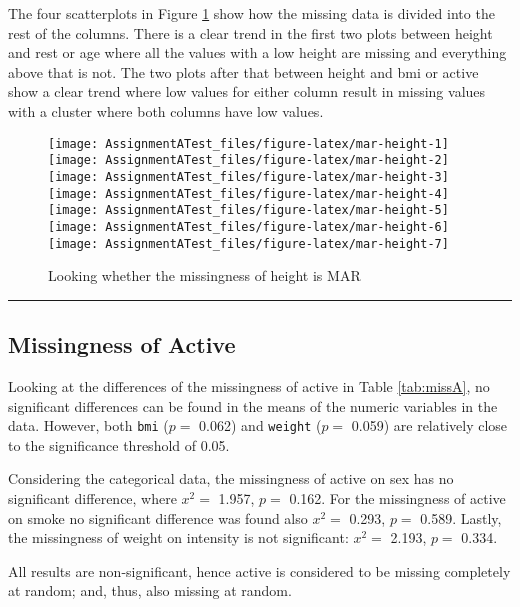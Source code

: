\documentclass[
]{article}
\begin{document}
The four scatterplots in Figure \ref{fig:mar-height} show how the missing data is divided into the rest of the columns. There is a clear trend in the first two plots between height and rest or age where all the values with a low height are missing and everything above that is not. The two plots after that between height and bmi or active show a clear trend where low values for either column result in missing values with a cluster where both columns have low values.

\begin{figure}
\texttt{[image: AssignmentATest\_files/figure-latex/mar-height-1]} \texttt{[image: AssignmentATest\_files/figure-latex/mar-height-2]} \texttt{[image: AssignmentATest\_files/figure-latex/mar-height-3]} \texttt{[image: AssignmentATest\_files/figure-latex/mar-height-4]} \texttt{[image: AssignmentATest\_files/figure-latex/mar-height-5]} \texttt{[image: AssignmentATest\_files/figure-latex/mar-height-6]} \texttt{[image: AssignmentATest\_files/figure-latex/mar-height-7]} \caption{Looking whether the missingness of height is MAR}\label{fig:mar-height}
\end{figure}

\begin{center}\rule{0.5\linewidth}{0.5pt}\end{center}

\hypertarget{missingness-of-active}{%
\subsection{Missingness of Active}\label{missingness-of-active}}

Looking at the differences of the missingness of active in Table \ref{tab:missA}, no significant differences can be found in the means of the numeric variables in the data. However, both \texttt{bmi} (\(p =\) 0.062) and \texttt{weight} (\(p =\) 0.059) are relatively close to the significance threshold of 0.05.

Considering the categorical data, the missingness of active on sex has no significant difference, where \(x^2 =\) 1.957, \(p =\) 0.162. For the missingness of active on smoke no significant difference was found also \(x^2 =\) 0.293, \(p =\) 0.589. Lastly, the missingness of weight on intensity is not significant: \(x^2 =\) 2.193, \(p =\) 0.334.

All results are non-significant, hence active is considered to be missing completely at random; and, thus, also missing at random.
\end{document}
